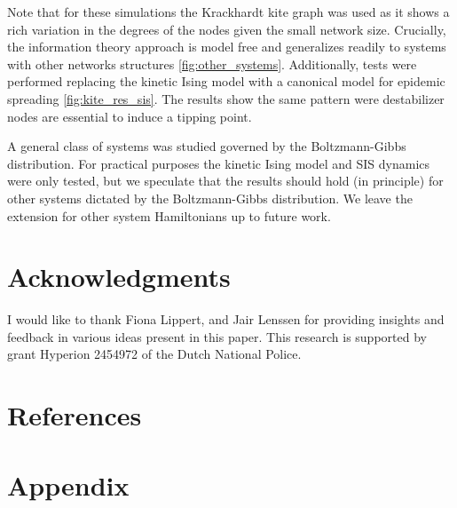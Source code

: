 \documentclass[a4paper, 11pt, twocolumn]{article}
\begin{document}
Note that for these simulations the Krackhardt kite graph was used as it shows a rich variation in the degrees of the nodes given the small network size. Crucially, the information theory approach is model free and generalizes readily to systems with other networks structures \cref{fig:other_systems}. Additionally, tests were performed replacing the kinetic Ising model with a canonical model for epidemic spreading \cref{fig:kite_res_sis}. The results show the same pattern were destabilizer nodes are essential to induce a tipping point.

A  general class  of  systems was  studied  governed by  the
Boltzmann-Gibbs  distribution.  For practical  purposes  the
kinetic Ising model  and SIS dynamics were  only tested, but
we speculate that the results should hold (in principle) for
other systems dictated  by the Boltzmann-Gibbs distribution.
We leave the  extension for other system  Hamiltonians up to
future work.
\section{Acknowledgments}
\label{sec:orgf30530a}
I would  like to  thank Fiona Lippert,  and Jair  Lenssen for
providing insights and feedback  in various ideas present in
this  paper. This  research is  supported by  grant Hyperion
2454972 of the Dutch National Police.

\section{References}
\label{sec:org26fe258}
\printbibliography[heading=none]

\section{Appendix}
\label{sec:org854db8e}
\end{document}
